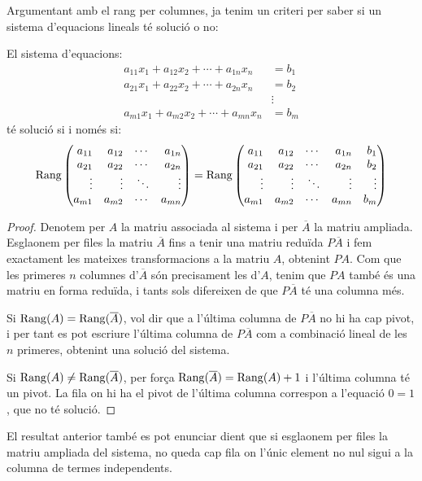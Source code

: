 Argumentant amb el rang per columnes, ja tenim un criteri per saber si un sistema d'equacions lineals té solució o no:
\begin{proposicio}
	El sistema d'equacions:
	\begin{align*}
	a_{11}x_1+a_{12}x_2+ \cdots + a_{1n}x_n &= b_1 \\
	a_{21}x_1+a_{22}x_2+ \cdots + a_{2n}x_n &= b_2 \\
	&\vdots \\
	a_{m1}x_1+a_{m2}x_2+ \cdots + a_{mn}x_n &= b_m
	\end{align*}
	té solució si i només si:
	\[\Rang \begin{pmatrix*}[r]
	a_{11} & a_{12} & \cdots & a_{1n} \\
	a_{21} & a_{22} & \cdots & a_{2n} \\
	\vdots & \vdots & \ddots & \vdots \\
	a_{m1} & a_{m2} & \cdots & a_{mn} 
	\end{pmatrix*} =
	\Rang \begin{pmatrix*}[r]
	a_{11} & a_{12} & \cdots & a_{1n} & b_1 \\
	a_{21} & a_{22} & \cdots & a_{2n} & b_2 \\
	\vdots & \vdots & \ddots & \vdots & \vdots \\
	a_{m1} & a_{m2} & \cdots & a_{mn} & b_m 
	\end{pmatrix*}
	\]
\end{proposicio}
\begin{proof}
	Denotem per $A$ la matriu associada al sistema i per $\overline{A}$ la matriu ampliada.
	Esglaonem per files la matriu $\overline{A}$ fins a tenir una matriu reduïda $P\overline{A}$ i fem exactament les mateixes transformacions a la matriu $A$, obtenint $PA$.
	Com que les primeres $n$ columnes d'$\overline{A}$ són precisament les d'$A$, tenim que $PA$ també és una matriu en forma reduïda, i tants sols difereixen de que $P\overline{A}$ té una columna més. 
	
	Si $\operatorname{Rang}(A)=\operatorname{Rang}(\overline{A})$, vol dir que a l'última columna de $P\overline{A}$ no hi ha cap pivot, i per tant es pot escriure l'última columna de $P\overline{A}$ com a combinació lineal de les $n$ primeres, obtenint una solució del sistema.
	
	Si $\operatorname{Rang}(A)\neq\operatorname{Rang}(\overline{A})$, per força $\operatorname{Rang}(\overline{A})=\operatorname{Rang}(A)+1$ i l'última columna té un pivot. La fila on hi ha el pivot de l'última columna correspon a l'equació $0=1$, que no té solució.
\end{proof}
El resultat anterior també es pot enunciar dient que si esglaonem per files la matriu ampliada del sistema, no queda cap fila on l'únic element no nul sigui a la columna de termes independents.

